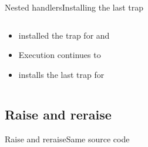 \begin{frame}{Nested handlers}{Installing the last trap}
\begin{columns}[c]
\begin{column}{0.5\textwidth}
\begin{itemize}
\item<1->  installed the trap for  and 
\item<1-> Execution continues to 
\item<2->  installs the last trap for 
\end{itemize}
\bigskip
{}
\end{column}
\begin{column}{0.5\textwidth}
\centering
{}%
%
\end{column}
\end{columns}
\end{frame}




%
%
\subsection{Raise and reraise}

\begin{frame}{Raise and reraise}{Same source code}
\end{frame}


